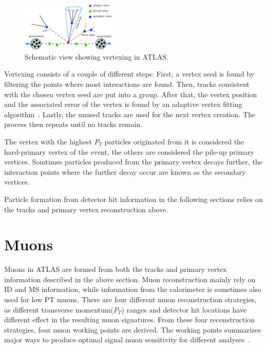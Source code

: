 \begin{figure}[!htb]
    \begin{center}
        \includegraphics[width=0.4\textwidth]{figures/common_ana/Vertex}
        \caption{        
            Schematic view showing vertexing in ATLAS\cite{4774734}.
        }
    \end{center}
\end{figure}

Vertexing consists of a couple of different steps: First, a vertex seed is found by filtering the points where most interactions are found. Then, tracks consistent with the chosen vertex seed are put into a group. After that, the vertex position and the associated error of the vertex is found by an adaptive vertex fitting algorithm~\cite{track}. Lastly, the unused tracks are used for the next vertex creation. The process then repeats until no tracks remain. 

The vertex with the highest $P_{T}$ particles originated from it is considered the hard-primary vertex of the event, the others are considered the pile-up primary vertices. Somtimes particles produced from the primary vertex decays further, the interaction points where the further decay occur are known as the secondary vertices.

Particle formation from detector hit information in the following sections relies on the tracks and primary vertex reconstruction above.

\section{Muons}
\label{sec:Muon}
Muons in ATLAS are formed from both the tracks and primary vertex information described in the above section. Muon reconstruction mainly rely on ID and MS information, while information from the calorimeter is sometimes also used for low PT muons. There are four different muon reconstruction strategies, as different transverse momentum($P_{T}$) ranges and detector hit locations have different effect in the resulting muon signatures. From these four reconstruction strategies, four muon working
points are derived. The working points summarizes major ways to produce optimal signal muon sensitivity for different analyses~\cite{Aad:2746302}.

